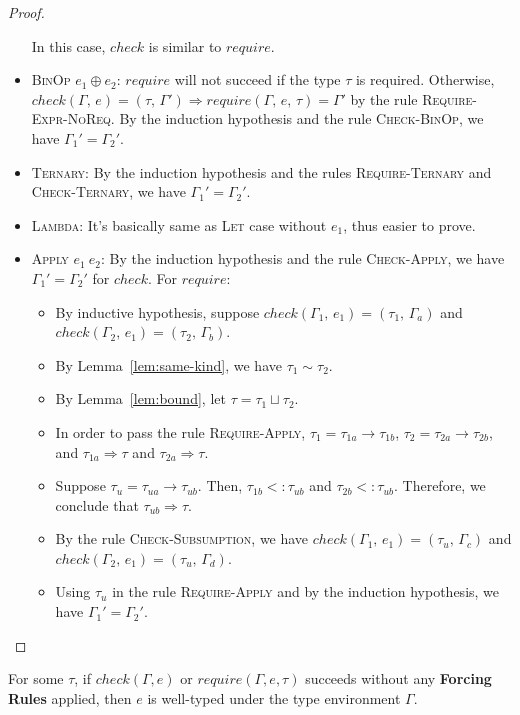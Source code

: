 \documentclass[peerreview, 10pt]{IEEEtran}
\newcommand{\binop}[2]{\ensuremath{#1\ \mathsf{\oplus}\ #2}}
\newcommand{\apply}[2]{\ensuremath{#1\ #2}}
\newcommand{\arrowt}[2]{\ensuremath{{#1}\rightarrow{#2}}}
\newcommand{\checktype}[4]{\ensuremath{{check}(#1,\,#2)=(#3,\,#4)}}
\newcommand{\requiretype}[4]{\ensuremath{{require}(#1,\,#2,\,#3)=#4}}
\newcommand{\forcerequire}[2]{\ensuremath{#1\Rightarrow#2}}
\begin{document}
\begin{proof}
\begin{itemize}
        In this case, $check$ is similar to $require$.
        \item \textsc{BinOp} \binop{e_1}{e_2}: $require$ will not succeed if the type $\tau$ is required. Otherwise, $\checktype{\Gamma}{e}{\tau}{\Gamma'}\Rightarrow\requiretype{\Gamma}{e}{\tau}{\Gamma'}$ by the rule \textsc{Require-Expr-NoReq}. By the induction hypothesis and the rule \textsc{Check-BinOp}, we have $\Gamma_1'=\Gamma_2'$.
        \item \textsc{Ternary}: By the induction hypothesis and the rules \textsc{Require-Ternary} and \textsc{Check-Ternary}, we have $\Gamma_1'=\Gamma_2'$.
        \item \textsc{Lambda}: It's basically same as \textsc{Let} case without $e_1$, thus easier to prove.
        \item \textsc{Apply} \apply{e_1}{e_2}: By the induction hypothesis and the rule \textsc{Check-Apply}, we have $\Gamma_1'=\Gamma_2'$ for $check$. For $require$:
        \begin{itemize}
            \item By inductive hypothesis, suppose $\checktype{\Gamma_1}{e_1}{\tau_1}{\Gamma_a}$ and $\checktype{\Gamma_2}{e_1}{\tau_2}{\Gamma_b}$.
            \item By Lemma~\ref{lem:same-kind}, we have $\tau_1\sim\tau_2$.
            \item By Lemma~\ref{lem:bound}, let $\tau=\tau_1\sqcup\tau_2$. 
            \item In order to pass the rule \textsc{Require-Apply}, $\tau_1=\arrowt{\tau_{1a}}{\tau_{1b}}$, $\tau_2=\arrowt{\tau_{2a}}{\tau_{2b}}$, and $\forcerequire{\tau_{1a}}{\tau}$ and $\forcerequire{\tau_{2a}}{\tau}$.
            \item Suppose $\tau_u=\arrowt{\tau_{ua}}{\tau_{ub}}$. Then, $\tau_{1b}<:\tau_{ub}$ and $\tau_{2b}<:\tau_{ub}$. Therefore, we conclude that $\forcerequire{\tau_{ub}}{\tau}$.
            \item By the rule \textsc{Check-Subsumption}, we have $\checktype{\Gamma_1}{e_1}{\tau_u}{\Gamma_c}$ and $\checktype{\Gamma_2}{e_1}{\tau_u}{\Gamma_d}$.
            \item Using $\tau_u$ in the rule \textsc{Require-Apply} and by the induction hypothesis, we have $\Gamma_1'=\Gamma_2'$.
        \end{itemize}
    \end{itemize}
\end{proof}

\begin{theorem}
    \label{thm:check-well-typed}
    For some $\tau$, if $check(\Gamma, e)$ or $require(\Gamma, e, \tau)$ succeeds without any \textbf{Forcing Rules} applied, then $e$ is well-typed under the type environment $\Gamma$.
\end{theorem}
\end{document}
